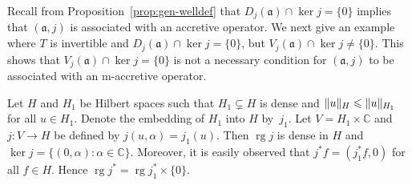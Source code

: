 \documentclass[a4paper,oneside,12pt]{amsart}
\theoremstyle{plain}
\theoremstyle{definition}
\newenvironment{example}
{\pushQED{\qed}

\examplex}
{\popQED\endexamplex}
\let\le=\leqslant
\DeclarePairedDelimiter\norm{\lVert}{\rVert}
\begin{document}
Recall from Proposition~\ref{prop:gen-welldef} that $D_j({{\mathfrak{{a}}}})\cap\ker j=\{0\}$ implies that $({{\mathfrak{{a}}}},j)$ is associated with an accretive operator.
We next give an example where $T$ is invertible and $D_j({{\mathfrak{{a}}}})\cap\ker j=\{0\}$, but $V_j({{\mathfrak{{a}}}})\cap\ker j\ne\{0\}$.
This shows that $V_j({{\mathfrak{{a}}}})\cap\ker j=\{0\}$ is not a necessary condition for $({{\mathfrak{{a}}}},j)$ to be associated with an {\ensuremath{\text{m}}}-accretive operator.
\begin{example}
Let $H$ and $H_1$ be Hilbert spaces such that $H_1\subsetneq H$ is dense and $\norm{u}_{H}\le\norm{u}_{H_1}$ for all $u\in H_1$. 
Denote the embedding of $H_1$ into $H$ by~$j_1$.
Let $V=H_1\times{\mathbb{C}}$ and $j\colon V\to H$ be defined by
$j(u,\alpha)=j_1(u)$. Then $\operatorname{rg} j$ is dense in $H$ and $\ker j=\{(0,\alpha):\alpha\in{\mathbb{C}}\}$. 
Moreover, it is easily observed that $j^*f=(j_1^*f,0)$ for all $f\in H$. Hence $\operatorname{rg} j^*=\operatorname{rg} j_1^*\times\{0\}$.


\end{example}
\end{document}
